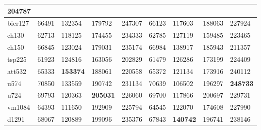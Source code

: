 \begin{table}[ht]
{\begin{tabular}{|l|llll|llll|}
    204787 \\ \hline
  bier127 &
    \multicolumn{1}{l|}{66491} &
    \multicolumn{1}{l|}{132354} &
    \multicolumn{1}{l|}{179792} &
    247307 &
    \multicolumn{1}{l|}{66123} &
    \multicolumn{1}{l|}{117603} &
    \multicolumn{1}{l|}{188063} &
    227924 \\ \hline
  ch130 &
    \multicolumn{1}{l|}{62713} &
    \multicolumn{1}{l|}{118125} &
    \multicolumn{1}{l|}{174455} &
    234333 &
    \multicolumn{1}{l|}{62785} &
    \multicolumn{1}{l|}{127119} &
    \multicolumn{1}{l|}{159485} &
   223465 \\ \hline
  ch150 &
    \multicolumn{1}{l|}{66845} &
    \multicolumn{1}{l|}{123024} &
    \multicolumn{1}{l|}{179031} &
    235174 &
    \multicolumn{1}{l|}{66984} &
    \multicolumn{1}{l|}{138917} &
    \multicolumn{1}{l|}{185943} &
    211357 \\ \hline
  tsp225 &
    \multicolumn{1}{l|}{61923} &
    \multicolumn{1}{l|}{124816} &
    \multicolumn{1}{l|}{163056} &
    202829 &
    \multicolumn{1}{l|}{61479} &
    \multicolumn{1}{l|}{126286} &
    \multicolumn{1}{l|}{173199} &
    224409 \\ \hline
  att532 &
    \multicolumn{1}{l|}{65333} &
    \multicolumn{1}{l|}{\textbf{153374}} &
    \multicolumn{1}{l|}{188061} &
    220558 &
    \multicolumn{1}{l|}{65372} &
    \multicolumn{1}{l|}{121134} &
    \multicolumn{1}{l|}{173916} &
    240112 \\ \hline
  u574 &
    \multicolumn{1}{l|}{70850} &
    \multicolumn{1}{l|}{133559} &
    \multicolumn{1}{l|}{190742} &
    231134 &
    \multicolumn{1}{l|}{70639} &
    \multicolumn{1}{l|}{106502} &
    \multicolumn{1}{l|}{196297} &
    \textbf{248733} \\ \hline
  u724 &
    \multicolumn{1}{l|}{69793} &
    \multicolumn{1}{l|}{120363} &
    \multicolumn{1}{l|}{\textbf{205031}} &
    226060 &
    \multicolumn{1}{l|}{69700} &
    \multicolumn{1}{l|}{117866} &
    \multicolumn{1}{l|}{200697} &
    229731 \\ \hline
  vm1084 &
    \multicolumn{1}{l|}{64393} &
    \multicolumn{1}{l|}{111650} &
    \multicolumn{1}{l|}{192909} &
    225794 &
    \multicolumn{1}{l|}{64545} &
    \multicolumn{1}{l|}{122070} &
    \multicolumn{1}{l|}{174608} &
    227990 \\ \hline
  d1291 &
    \multicolumn{1}{l|}{68067} &
    \multicolumn{1}{l|}{120889} &
    \multicolumn{1}{l|}{199096} &
    235376 &
    \multicolumn{1}{l|}{67843} &
    \multicolumn{1}{l|}{\textbf{140742}} &
    \multicolumn{1}{l|}{196741} &
    238146 \\ \hline
  \end{tabular}%
  }
\end{table}

